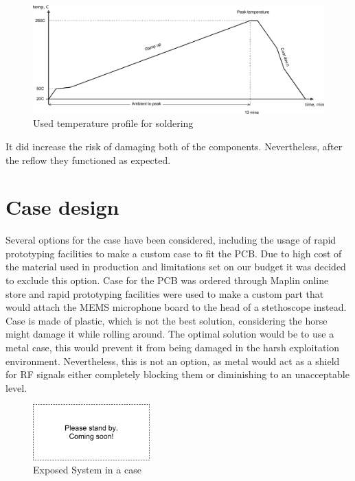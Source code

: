 \begin{figure}
\centering
\includegraphics[width=\textwidth]{Images/Thermal_profile_used}
\caption{Used temperature profile for soldering}
\label{fig:temp_profile_used}
\end{figure}

It did increase the risk of damaging both of the components. Nevertheless, after the reflow they functioned as expected.


\section{Case design}
Several options for the case have been considered, including the usage of rapid prototyping facilities to make a custom case to fit the PCB. Due to high cost of the material used in production and limitations set on our budget it was decided to exclude this option. Case for the PCB was ordered through Maplin online store and rapid prototyping facilities were used to make a custom part that would attach the MEMS microphone board to the head of a stethoscope instead. Case is made of plastic, which is not the best solution, considering the horse might damage it while rolling around. The optimal solution would be to use a metal case, this would prevent it from being damaged in the harsh exploitation environment. Nevertheless, this is not an option, as metal would act as a shield for RF signals either completely blocking them or diminishing to an unacceptable level. 

\begin{figure}
\centering
\includegraphics[width=0.4\textwidth]{Images/dummy}
\caption{Exposed System in a case}
\label{fig:case_monitor}
\end{figure}

